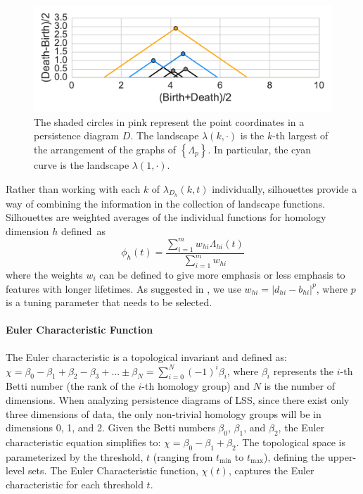 \documentclass[12pt]{article}
\begin{document}
\begin{center}
\begin{figure}[htp!]
  \centering
  \includegraphics[width=0.6\linewidth]{figure_3_silh.pdf}
    \caption{ The shaded circles in pink represent the point coordinates in a persistence diagram $D$. The landscape $\lambda(k, \cdot)$ is the $k$-th largest of the arrangement of the graphs of $\left \{ \Lambda_{p} \right \}$. In particular, the cyan curve is the landscape $\lambda(1, \cdot)$.}
    \label{fig:landscape}
\end{figure}
\end{center}

Rather than working with each $k$ of $\lambda_{D_h}(k, t)$ individually, silhouettes provide a way of combining the information in the collection of landscape functions.  Silhouettes are weighted averages of the individual functions for homology dimension $h$ defined~as
%
\begin{equation*}
\phi_h(t) = \frac{\sum_{i = 1}^mw_{hi}\Lambda_{hi}(t)}{\sum_{i = 1}^mw_{hi}}
\end{equation*}
where the weights $w_i$ can be defined to give more emphasis or less emphasis to features with longer lifetimes.  As suggested in \citep{chazal2014stochastic}, we use $w_{hi} = |d_{hi} - b_{hi}|^p$, where $p$ is a tuning parameter that needs to be selected.

\paragraph{Euler Characteristic Function}
The Euler characteristic is a topological invariant and defined as: $\chi = \beta_{0} - \beta_{1} + \beta_{2} - \beta_{3} + ... \pm \beta_N = \sum_{i=0}^{N} (-1)^{i} \beta_{i}$,
where $\beta_{i}$ represents the $i$-th Betti number (the rank of the $i$-th homology group) and $N$ is the number of dimensions. When analyzing persistence diagrams of LSS, since there exist only three dimensions of data, the only non-trivial homology groups will be in dimensions 0, 1, and 2. Given the Betti numbers $\beta_{0}$, $\beta_{1}$, and $\beta_{2}$, the Euler characteristic equation simplifies to:
$\chi = \beta_{0} - \beta_{1} + \beta_{2}.$
The topological space is parameterized by the threshold, $t$ (ranging from $t_{\min}$ to $t_{\max}$), defining the upper-level sets. The Euler Characteristic function, $\chi(t)$, captures the Euler characteristic for each threshold $t$. 
\end{document}
